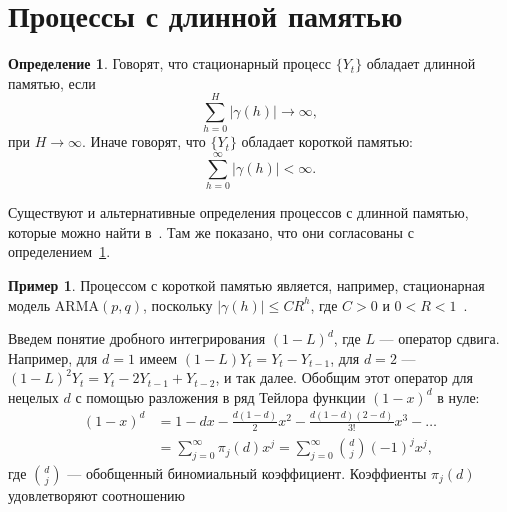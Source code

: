 \documentclass[specialist,
substylefile = spbu_report.rtx,
subf,href,colorlinks=true, 12pt]{disser}
\theoremstyle{definition}
\newtheorem{definition}{Определение}[section]
\newtheorem{example}{Пример}[section]
\begin{document}
\section{Процессы с длинной памятью}

\begin{definition}\label{def:longmemory}
	Говорят, что стационарный процесс $\{Y_t\}$ обладает длинной памятью, если
	\[
		\sum_{h=0}^H|\gamma(h)|\to\infty,
	\]
	при $H\to\infty$. Иначе говорят, что $\{Y_t\}$ обладает короткой памятью:
	\[
		\sum_{h=0}^\infty|\gamma(h)|<\infty.
	\]
\end{definition}
Существуют и альтернативные определения процессов с длинной памятью, которые можно найти в~\cite[Section 3.1]{Palma2006}. Там же показано, что они согласованы с определением~\ref{def:longmemory}.
\begin{example}
	Процессом с короткой памятью является, например, стационарная модель $\mathrm{ARMA}(p, q)$, поскольку $|\gamma(h)|\leqslant CR^h$, где $C>0$ и $0<R<1$~\cite{BoxJenkins2016}.
\end{example}
Введем понятие дробного интегрирования $(1-L)^d$, где $L$ --- оператор сдвига. Например, для $d=1$ имеем $(1-L)Y_t=Y_t-Y_{t-1}$, для $d=2$ --- $(1-L)^2Y_t=Y_t-2Y_{t-1}+Y_{t-2}$, и так далее. Обобщим этот оператор для нецелых $d$ с помощью разложения в ряд Тейлора функции $(1-x)^d$ в нуле:
\[
	\begin{aligned}
		(1-x)^d & =1-dx-\frac{d(1-d)}{2}x^2-\frac{d(1-d)(2-d)}{3!}x^3-\ldots             \\
		        & =\sum_{j=0}^\infty \pi_j(d)x^j=\sum_{j=0}^\infty\binom{d}{j}(-1)^jx^j,
	\end{aligned}
\]
где $\binom{d}{j}$ --- обобщенный биномиальный коэффициент. Коэффиенты $\pi_j(d)$ удовлетворяют соотношению
\end{document}
